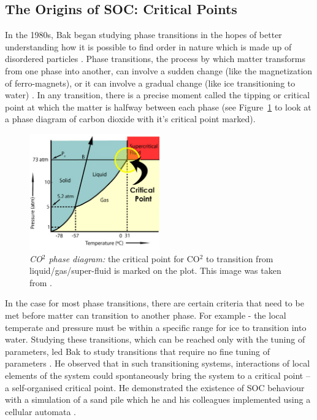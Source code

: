 \documentclass{book}
\begin{document}
\subsection{The Origins of SOC: Critical Points}
In the 1980s, Bak began studying phase transitions in the hopes of better understanding how it is possible to find order in nature which is made up of disordered particles \cite{MindSandWeb}. Phase transitions, the process by which matter transforms from one phase into another, can involve a sudden change (like the magnetization of ferro-magnets), or it can involve a gradual change (like ice transitioning to water) \cite{PhaseTransitionInfo}. In any transition, there is a precise moment called the tipping or critical point at which the matter is halfway between each phase (see Figure~\ref{fig:critPoint} to look at a phase diagram of carbon dioxide with it's critical point marked).

\begin{figure}[h]
	\centering
	\includegraphics[width=0.5\textwidth]{Figures/Intro/SandPileFigs/critical_co2}
	\caption[CO$^2$ phase diagram]{
\textit{CO$^2$ phase diagram:} the critical point for CO$^2$ to transition from liquid/gas/super-fluid is marked on the plot. This image was taken from \cite{IMGCriticalPoint}. 
}
	\label{fig:critPoint}
\end{figure}


 In the case for most phase transitions, there are certain criteria that need to be met before matter can transition to another phase. For example - the local temperate and pressure must be within a specific range for ice to transition into water. Studying these transitions, which can be reached only with the tuning of parameters, led Bak to study transitions that require no fine tuning of parameters \cite{MindSandWeb}. He observed that in such transitioning systems, interactions of local elements of the system could spontaneously bring the system to a critical point -- a self-organised critical point. He demonstrated the existence of SOC behaviour with a simulation of a sand pile which he and his colleagues implemented using a cellular automata \cite{OGperBak1987}. 
\end{document}
